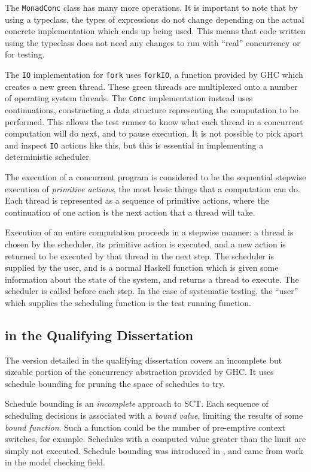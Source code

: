 The \verb|MonadConc| class has many more operations. It is important
to note that by using a typeclass, the types of expressions do not
change depending on the actual concrete implementation which ends up
being used. This means that code written using the typeclass does not
need any changes to run with ``real'' concurrency or for testing.

The \verb|IO| implementation for \verb|fork| uses \verb|forkIO|, a
function provided by GHC which creates a new green thread. These green
threads are multiplexed onto a number of operating system threads. The
\verb|Conc| implementation instead uses continuations, constructing a
data structure representing the computation to be performed. This
allows the test runner to know what each thread in a concurrent
computation will do next, and to pause execution. It is not possible
to pick apart and inspect \verb|IO| actions like this, but this is
essential in implementing a deterministic scheduler.

The execution of a concurrent program is considered to be the
sequential stepwise execution of \emph{primitive actions}, the most
basic things that a computation can do. Each thread is represented as
a sequence of primitive actions, where the continuation of one action
is the next action that a thread will take.

Execution of an entire computation proceeds in a stepwise manner: a
thread is chosen by the scheduler, its primitive action is executed,
and a new action is returned to be executed by that thread in the next
step. The scheduler is supplied by the user, and is a normal Haskell
function which is given some information about the state of the
system, and returns a thread to execute. The scheduler is called
before each step. In the case of systematic testing, the ``user''
which supplies the scheduling function is the test running function.

\subsection{\dejafu{} in the Qualifying Dissertation}
\label{sec:progress-dejafu-old}

The version detailed in the qualifying dissertation covers an
incomplete but sizeable portion of the concurrency abstraction
provided by GHC. It uses schedule bounding for pruning the space of
schedules to try.

Schedule bounding is an \emph{incomplete} approach to SCT. Each
sequence of scheduling decisions is associated with a \emph{bound
  value}, limiting the results of some \emph{bound function}. Such a
function could be the number of pre-emptive context switches, for
example. Schedules with a computed value greater than the limit are
simply not executed. Schedule bounding was introduced in
\citep{pbound}, and came from work in the model checking field.

